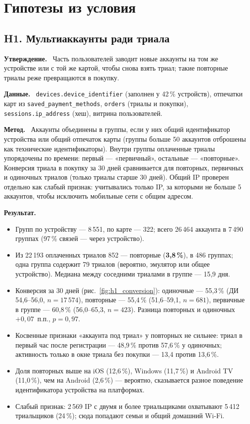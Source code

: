 \documentclass[11pt,a4paper]{article}
\newcommand{\hblock}[1]{\par\smallskip\noindent\textbf{#1.}~}
\begin{document}
\section{Гипотезы из условия}

\subsection{H1. Мультиаккаунты ради триала}

\hblock{Утверждение} Часть пользователей заводит новые аккаунты на том же устройстве или с той же картой, чтобы снова взять триал; такие повторные триалы реже превращаются в покупку.

\hblock{Данные} \texttt{devices.device\_identifier} (заполнен у 42\,\% устройств), отпечатки карт из \texttt{saved\_payment\_methods}, \texttt{orders} (триалы и покупки), \texttt{sessions.ip\_address} (хеш), витрина пользователей.

\hblock{Метод} Аккаунты объединены в группы, если у них общий идентификатор устройства или общий отпечаток карты (группы больше 50 аккаунтов отброшены как технические идентификаторы). Внутри группы оплаченные триалы упорядочены по времени: первый --- «первичный», остальные --- «повторные». Конверсия триала в покупку за 30 дней сравнивается для повторных, первичных и одиночных триалов (только триалы старше 30 дней). Общий IP проверен отдельно как слабый признак: учитывались только IP, за которыми не больше 5 аккаунтов, чтобы исключить мобильные сети с общим адресом.

\hblock{Результат}
\begin{itemize}
  \item Групп по устройству --- 8\,551, по карте --- 322; всего 26\,464 аккаунта в 7\,490 группах (97\,\% связей --- через устройство).
  \item Из 22\,193 оплаченных триалов 852 --- повторные (\textbf{3,8\,\%}), в 486 группах; одна группа содержит 79 триалов (вероятно, эмулятор или общее устройство). Медиана между соседними триалами в группе --- 15,9 дня.
  \item Конверсия за 30 дней (рис.~\ref{fig:h1_conversion}): одиночные --- 55,3\,\% (ДИ 54,6--56,0, $n=17\,574$), повторные --- 55,4\,\% (51,6--59,1, $n=681$), первичные в группе --- 60,8\,\% (56,0--65,3, $n=423$). Разница повторных и одиночных $+0{,}07$~п.п., $p=0{,}97$.
  \item Косвенные признаки «аккаунта под триал» у повторных не сильнее: триал в первый час после регистрации --- 48,9\,\% против 57,6\,\% у одиночных; активность только в окне триала без покупки --- 13,4 против 13,6\,\%.
  \item Доля повторных выше на iOS (12,6\,\%), Windows (11,7\,\%) и Android TV (11,0\,\%), чем на Android (2,6\,\%) --- вероятно, сказывается разное поведение идентификатора устройства на платформах.
  \item Слабый признак: 2\,569 IP с двумя и более триальщиками охватывают 5\,412 триальщиков (24\,\%); сюда попадают семьи и общий домашний Wi-Fi.
\end{itemize}
\end{document}
